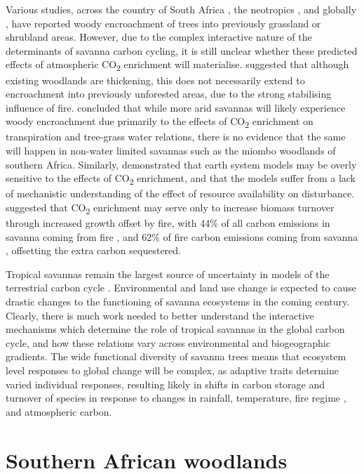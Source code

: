 \begin{refsection}
Various studies, across the country of South Africa \citep{Stevens2016b}, the neotropics \citep{Rosan2019}, and globally \citep{Stevens2016}, have reported woody encroachment of trees into previously grassland or shrubland areas. However, due to the complex interactive nature of the determinants of savanna carbon cycling, it is still unclear whether these predicted effects of atmospheric CO\textsubscript{2} enrichment will materialise. \citet{Lewis2009} suggested that although existing woodlands are thickening, this does not necessarily extend to encroachment into previously unforested areas, due to the strong stabilising influence of fire. \citet{Pelletier2018} concluded that while more arid savannas will likely experience woody encroachment due primarily to the effects of CO\textsubscript{2} enrichment on transpiration and tree-grass water relations, there is no evidence that the same will happen in non-water limited savannas such as the miombo woodlands of southern Africa. Similarly, \citep{Reich2014} demonstrated that earth system models may be overly sensitive to the effects of CO\textsubscript{2} enrichment, and that the models suffer from a lack of mechanistic understanding of the effect of resource availability on disturbance. \citet{Korner2017} suggested that CO\textsubscript{2} enrichment may serve only to increase biomass turnover through increased growth offset by fire, with 44\% of all carbon emissions in savanna coming from fire \citep{Werf2010}, and 62\% of fire carbon emissions coming from savanna \citep{Werf2017}, offsetting the extra carbon sequestered.

Tropical savannas remain the largest source of uncertainty in models of the terrestrial carbon cycle \citep{Ahlstrom2015}. Environmental and land use change is expected to cause drastic changes to the functioning of savanna ecosystems in the coming century. Clearly, there is much work needed to better understand the interactive mechanisms which determine the role of tropical savannas in the global carbon cycle, and how these relations vary across environmental and biogeographic gradients. The wide functional diversity of savanna trees means that ecosystem level responses to global change will be complex, as adaptive traits determine varied individual responses, resulting likely in shifts in carbon storage and turnover of species in response to changes in rainfall, temperature, fire regime , and atmospheric carbon.

\section{Southern African woodlands}


\end{refsection}
